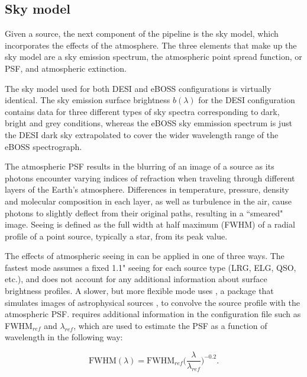 \subsection{Sky model}
Given a source, the next component of the  pipeline is the sky model, which incorporates the effects of the atmosphere. The three elements that make up the sky model are a sky emission spectrum, the atmospheric point spread function, or PSF, and atmospheric extinction.


The sky model used for both DESI and eBOSS configurations is virtually identical. The sky emission surface brightness $b(\lambda)$ for the DESI configuration contains data for three different types of sky spectra corresponding to dark, bright and grey conditions, whereas the eBOSS sky emmission spectrum is just the DESI dark sky extrapolated to cover the wider wavelength range of the eBOSS spectrograph.

The atmospheric PSF results in the blurring of an image of a source as its photons encounter varying indices of refraction when traveling through different layers of the Earth's atmosphere. Differences in temperature, pressure, density and molecular composition in each layer, as well as turbulence in the air, cause photons to slightly deflect from their original paths, resulting in a ``smeared" image. Seeing is defined as the full width at half maximum (FWHM) of a radial profile of a point source, typically a star, from its peak value.

The effects of atmospheric seeing in  can be applied in one of three ways. The fastest mode assumes a fixed 1.1" seeing for each source type (LRG, ELG, QSO, etc.), and does not account for any additional information about surface brightness profiles. A slower, but more flexible mode uses , a package that simulates images of astrophysical sources \cite{Rowe_2015}, to convolve the source profile with the atmospheric PSF.  requires additional information in the configuration file such as FWHM$_{ref}$ and $\lambda_{ref}$, which are used to estimate the PSF as a function of wavelength in the following way:

\begin{equation}
    \mbox{FWHM}(\lambda) = \mbox{FWHM}_{ref} \Big(\frac{\lambda}{\lambda_{ref}}\Big)^{-0.2}.
\end{equation}

